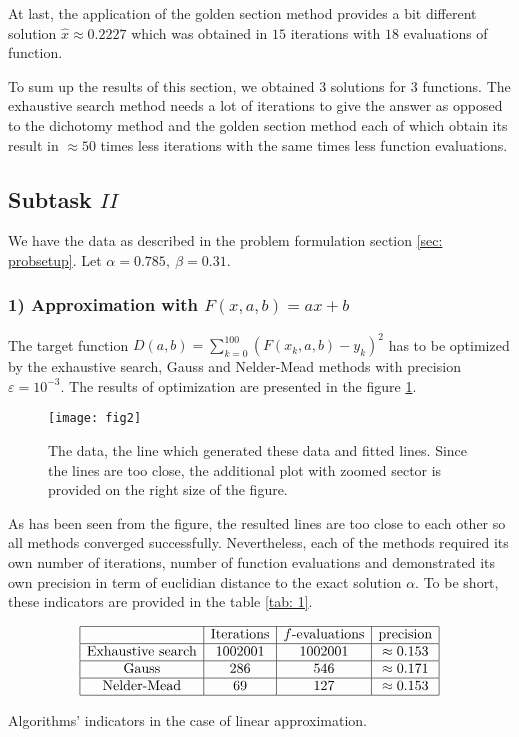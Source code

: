 \documentclass[12pt, bachelor, substylefile = algo_title.rtx]{disser}
\newcommand{\eps}{\varepsilon}
\theoremstyle{definition}
\begin{document}
At last, the application of the golden section method provides a bit different solution $\widehat{x} \approx 0.2227$ which was obtained in $15$ iterations with $18$ evaluations of function.

To sum up the results of this section, we obtained $3$ solutions for $3$ functions. The exhaustive search method needs a lot of iterations to give the answer as opposed to the dichotomy method and the golden section method each of which obtain its result in $\approx 50$ times less iterations with the same times less function evaluations.

\subsection{Subtask $II$}
We have the data as described in the problem formulation section \ref{sec: probsetup}. Let $\alpha = 0.785,\ \beta = 0.31$.
\subsubsection{1) Approximation with $F(x, a, b) = ax+b$}
The target function $D(a, b) = \sum_{k=0}^{100} (F(x_k,a,b)-y_k)^2$ has to be optimized by the exhaustive search, Gauss and Nelder-Mead methods with precision $\eps = 10^{-3}$. The results of optimization are presented in the figure \ref{fig: 2}.

\begin{figure}[h]
\begin{center}
\texttt{[image: fig2]}
\caption{The data, the line which generated these data and fitted lines. Since the lines are too close, the additional plot with zoomed sector is provided on the right size of the figure.}
\label{fig: 2}
\end{center}
\end{figure}

As has been seen from the figure, the resulted lines are too close to each other so all methods converged successfully. Nevertheless, each of the methods required its own number of iterations, number of function evaluations and demonstrated its own precision in term of euclidian distance to the exact solution $\alpha$. To be short, these indicators are provided in the table \ref{tab: 1}.

\begin{table}[h]
$$
\begin{array}{|c|c|c|c|}
\hline
 & \text{Iterations} & f\text{-evaluations} & \text{precision} \\
\hline
\text{Exhaustive search} & 1002001 & 1002001 & \approx 0.153\\ 
\hline
\text{Gauss} & 286 & 546 & \approx 0.171\\
\hline
\text{Nelder-Mead} & 69 & 127 & \approx 0.153\\
\hline
\end{array}
$$
\caption{Algorithms' indicators in the case of linear approximation.}
\label{tab: 1}
\end{table}
\end{document}
